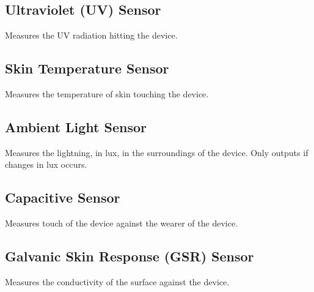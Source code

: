 \subsection{Ultraviolet (UV) Sensor}
\label{sub:uv_sensor}
Measures the UV radiation hitting the device.

\subsection{Skin Temperature Sensor}
\label{sub:skin_temperature_sensor}
Measures the temperature of skin touching the device.

\subsection{Ambient Light Sensor}
\label{sub:ambient_light_sensor}
Measures the lightning, in lux, in the surroundings of the device. Only outputs if changes in lux occurs.

\subsection{Capacitive Sensor}
\label{sub:capacitive_sensor}
Measures touch of the device against the wearer of the device.

\subsection{Galvanic Skin Response (GSR) Sensor}
\label{sub:galvanic_skin_respons_}
Measures the conductivity of the surface against the device.
